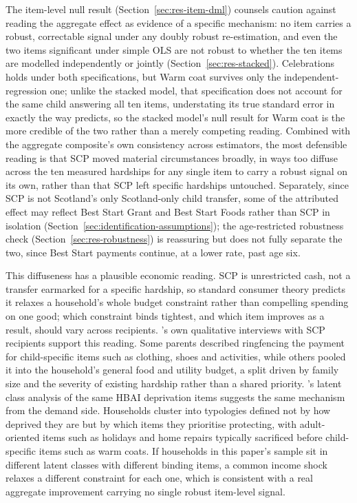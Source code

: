 The item-level null result (Section~\ref{sec:res-item-dml}) counsels caution against reading the aggregate effect as evidence of a specific mechanism: no item carries a robust, correctable signal under any doubly robust re-estimation, and even the two items significant under simple OLS are not robust to whether the ten items are modelled independently or jointly (Section~\ref{sec:res-stacked}). Celebrations holds under both specifications, but Warm coat survives only the independent-regression one; unlike the stacked model, that specification does not account for the same child answering all ten items, understating its true standard error in exactly the way \citet{moulton1990} predicts, so the stacked model's null result for Warm coat is the more credible of the two rather than a merely competing reading. Combined with the aggregate composite's own consistency across estimators, the most defensible reading is that SCP moved material circumstances broadly, in ways too diffuse across the ten measured hardships for any single item to carry a robust signal on its own, rather than that SCP left specific hardships untouched. Separately, since SCP is not Scotland's only Scotland-only child transfer, some of the attributed effect may reflect Best Start Grant and Best Start Foods rather than SCP in isolation (Section~\ref{sec:identification-assumptions}); the age-restricted robustness check (Section~\ref{sec:res-robustness}) is reassuring but does not fully separate the two, since Best Start payments continue, at a lower rate, past age six.
 
This diffuseness has a plausible economic reading. SCP is unrestricted cash, not a transfer earmarked for a specific hardship, so standard consumer theory predicts it relaxes a household's whole budget constraint rather than compelling spending on one good; which constraint binds tightest, and which item improves as a result, should vary across recipients. \citet{andersen2025}'s own qualitative interviews with SCP recipients support this reading. Some parents described ringfencing the payment for child-specific items such as clothing, shoes and activities, while others pooled it into the household's general food and utility budget, a split driven by family size and the severity of existing hardship rather than a shared priority. \citet{nicoriciuelliot2025}'s latent class analysis of the same HBAI deprivation items suggests the same mechanism from the demand side. Households cluster into typologies defined not by how deprived they are but by which items they prioritise protecting, with adult-oriented items such as holidays and home repairs typically sacrificed before child-specific items such as warm coats. If households in this paper's sample sit in different latent classes with different binding items, a common income shock relaxes a different constraint for each one, which is consistent with a real aggregate improvement carrying no single robust item-level signal.
 
